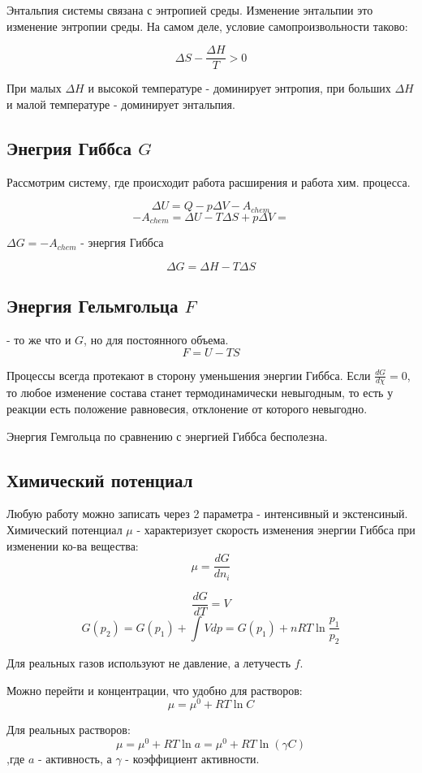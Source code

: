 \documentclass[11pt]{article}
\begin{document}
Энтальпия системы связана с энтропией среды. Изменение энтальпии это изменение энтропии среды. На самом деле, условие самопроизвольности таково:

$$\Delta S - \frac{\Delta H}{T} >0$$

При малых $\Delta H$ и высокой температуре - доминирует энтропия, при больших $\Delta H$ и малой температуре - доминирует энтальпия.
\subsection{Энегрия Гиббса $G$}
Рассмотрим систему, где происходит работа расширения и работа хим. процесса.

$$\Delta U = Q - p\Delta V - A_{chem}$$
$$-A_{chem} = \Delta U -T\Delta S + p\Delta V = $$

$ \Delta G=-A_{chem}$  - энергия Гиббса

$$\Delta G = \Delta H - T \Delta S $$

\subsection{Энергия Гельмгольца $F$} - то же что и $G$, но для постоянного объема.
$$F = U - TS$$

Процессы всегда протекают в сторону уменьшения энергии Гиббса. Если $\frac {dG}{d\chi} = 0$, то любое изменение состава станет термодинамически невыгодным, то есть у реакции есть положение равновесия, отклонение от которого невыгодно.

Энергия Гемгольца по сравнению с энергией Гиббса бесполезна.

\subsection{Химический потенциал}
Любую работу можно записать через 2 параметра - интенсивный и экстенсиный. Химический потенциал $\mu$ - характеризует скорость изменения энергии Гиббса при изменении ко-ва вещества:
$$\mu = \frac{dG}{dn_i}$$

$$\frac{dG}{dT} = V$$
$$G(p_2) = G(p_1) + \int Vdp = G(p_1) + nRT\ln\frac{p_1}{p_2}$$

Для реальных  газов используют не давление, а летучесть $f$.

Можно перейти и концентрации, что удобно для растворов:
$$\mu = \mu^0 + RT \ln C$$

Для реальных растворов:
$$\mu = \mu^0 + RT \ln a = \mu^0 + RT \ln (\gamma C)$$
,где $a$ - активность, а $\gamma$ - коэффициент активности.
\end{document}

